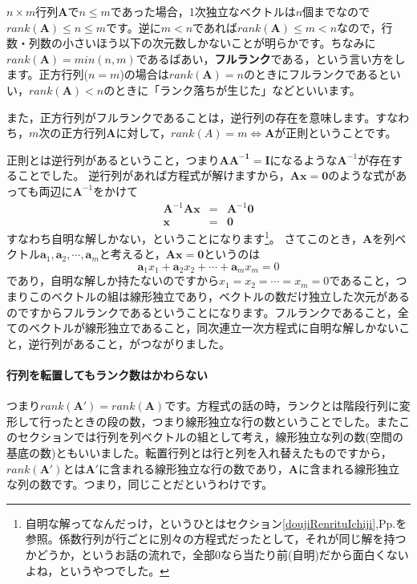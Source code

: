 \documentclass{ltjsbook}
\begin{document}
$n \times m$行列$\bm{A}$で$n \le m$であった場合，1次独立なベクトルは$n$個までなので$rank(\bm{A})\le n\le m$です。逆に$m < n$であれば$rank({\bm{A}})\le m < n$なので，行数・列数の小さいほう以下の次元数しかないことが明らかです。ちなみに$rank(\bm{A}) = min(n,m)$であるばあい，\textbf{フルランク}である，という言い方をします。正方行列($n=m$)の場合は$rank(\bm{A})=n$のときにフルランクであるといい，$rank(\bm{A})<n$のときに「ランク落ちが生じた」などといいます。

また，正方行列がフルランクであることは，逆行列の存在を意味します。すなわち，$m$次の正方行列$\bm{A}$に対して，$rank(A)=m\Leftrightarrow\bm{A}$が正則ということです。

正則とは逆行列があるということ，つまり$\bm{AA^{-1}}=\bm{I}$になるような$\bm{A}^{-1}$が存在することでした。
逆行列があれば方程式が解けますから，$\bm{Ax}=\bm{0}$のような式があっても両辺に$\bm{A}^{-1}$をかけて
\[
	\begin{array}{rcl}
		\bm{A}^{-1}\bm{Ax} & = & \bm{A}^{-1}\bm{0} \\
		\bm{x}             & = & \bm{0}
	\end{array}
\]
すなわち自明な解しかない，ということになります\footnote{自明な解ってなんだっけ，というひとはセクション\ref{doujiRenrituIchiji},Pp.\pageref{doujiRenrituIchiji}を参照。係数行列が行ごとに別々の方程式だったとして，それが同じ解を持つかどうか，というお話の流れで，全部0なら当たり前(自明)だから面白くないよね，というやつでした。}。
さてこのとき，$\bm{A}$を列ベクトル$\bm{a}_1,\bm{a}_2,\cdots,\bm{a}_m$と考えると，$\bm{Ax}=\bm{0}$というのは
\[ \bm{a}_1x_1 + \bm{a}_2x_2 + \cdots + \bm{a}_m x_m =0 \]
であり，自明な解しか持たないのですから$x_1=x_2=\cdots=x_m=0$であること，つまりこのベクトルの組は線形独立であり，ベクトルの数だけ独立した次元があるのですからフルランクであるということになります。フルランクであること，全てのベクトルが線形独立であること，同次連立一次方程式に自明な解しかないこと，逆行列があること，がつながりました。

\paragraph{行列を転置してもランク数はかわらない}つまり$rank(\bm{A}') = rank(\bm{A})$です。方程式の話の時，ランクとは階段行列に変形して行ったときの段の数，つまり線形独立な行の数ということでした。またこのセクションでは行列を列ベクトルの組として考え，線形独立な列の数(空間の基底の数)ともいいました。転置行列とは行と列を入れ替えたものですから，$rank(\bm{A}')$とは$\bm{A}'$に含まれる線形独立な行の数であり，$\bm{A}$に含まれる線形独立な列の数です。つまり，同じことだというわけです。
\end{document}
